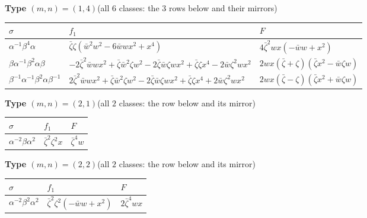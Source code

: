 \par\medskip\noindent\textbf{Type $(m,n)=(1,4)$}\quad (all $6$ classes: the $3$ rows below and their mirrors)
\par\nopagebreak\smallskip\noindent
{\small\begin{tabular}{@{}lll@{}}
\hline
$\sigma$ & $f_1$ & $F$ \\
\hline
$\alpha^{-1}\beta^{4}\alpha$ & $\bar{\zeta} \zeta \left(\bar{w}^{2} w^{2} - 6 \bar{w} w x^{2} + x^{4}\right)$ & $4 \bar{\zeta}^{2} w x \left(- \bar{w} w + x^{2}\right)$ \\[2pt]
$\beta\alpha^{-1}\beta^{2}\alpha\beta$ & $- 2 \bar{\zeta}^{2} \bar{w} w x^{2} + \bar{\zeta} \bar{w}^{2} \zeta w^{2} - 2 \bar{\zeta} \bar{w} \zeta w x^{2} + \bar{\zeta} \zeta x^{4} - 2 \bar{w} \zeta^{2} w x^{2}$ & $2 w x \left(\bar{\zeta} + \zeta\right) \left(\bar{\zeta} x^{2} - \bar{w} \zeta w\right)$ \\[2pt]
$\beta^{-1}\alpha^{-1}\beta^{2}\alpha\beta^{-1}$ & $2 \bar{\zeta}^{2} \bar{w} w x^{2} + \bar{\zeta} \bar{w}^{2} \zeta w^{2} - 2 \bar{\zeta} \bar{w} \zeta w x^{2} + \bar{\zeta} \zeta x^{4} + 2 \bar{w} \zeta^{2} w x^{2}$ & $2 w x \left(\bar{\zeta} - \zeta\right) \left(\bar{\zeta} x^{2} + \bar{w} \zeta w\right)$ \\[2pt]
\hline
\end{tabular}}

\par\medskip\noindent\textbf{Type $(m,n)=(2,1)$}\quad (all $2$ classes: the row below and its mirror)
\par\nopagebreak\smallskip\noindent
{\small\begin{tabular}{@{}lll@{}}
\hline
$\sigma$ & $f_1$ & $F$ \\
\hline
$\alpha^{-2}\beta\alpha^{2}$ & $\bar{\zeta}^{2} \zeta^{2} x$ & $\bar{\zeta}^{4} w$ \\[2pt]
\hline
\end{tabular}}

\par\medskip\noindent\textbf{Type $(m,n)=(2,2)$}\quad (all $2$ classes: the row below and its mirror)
\par\nopagebreak\smallskip\noindent
{\small\begin{tabular}{@{}lll@{}}
\hline
$\sigma$ & $f_1$ & $F$ \\
\hline
$\alpha^{-2}\beta^{2}\alpha^{2}$ & $\bar{\zeta}^{2} \zeta^{2} \left(- \bar{w} w + x^{2}\right)$ & $2 \bar{\zeta}^{4} w x$ \\[2pt]
\hline
\end{tabular}}

